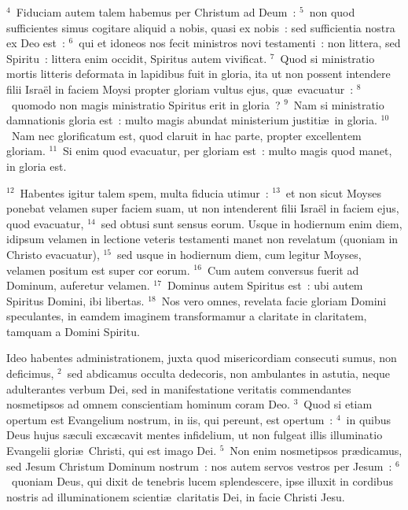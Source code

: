 ${}^{4}$~Fiduciam autem talem habemus per Christum ad Deum~:
${}^{5}$~non quod sufficientes simus cogitare aliquid a nobis, quasi ex nobis~: sed sufficientia nostra ex Deo est~:
${}^{6}$~qui et idoneos nos fecit ministros novi testamenti~: non littera, sed Spiritu~: littera enim occidit, Spiritus autem vivificat.
${}^{7}$~Quod si ministratio mortis litteris deformata in lapidibus fuit in gloria, ita ut non possent intendere filii Isra\"el in faciem Moysi propter gloriam vultus ejus, qu\ae\ evacuatur~:
${}^{8}$~quomodo non magis ministratio Spiritus erit in gloria~?
${}^{9}$~Nam si ministratio damnationis gloria est~: multo magis abundat ministerium justiti\ae\ in gloria.
${}^{10}$~Nam nec glorificatum est, quod claruit in hac parte, propter excellentem gloriam.
${}^{11}$~Si enim quod evacuatur, per gloriam est~: multo magis quod manet, in gloria est.


${}^{12}$~Habentes igitur talem spem, multa fiducia utimur~:
${}^{13}$~et non sicut Moyses ponebat velamen super faciem suam, ut non intenderent filii Isra\"el in faciem ejus, quod evacuatur,
${}^{14}$~sed obtusi sunt sensus eorum. Usque in hodiernum enim diem, idipsum velamen in lectione veteris testamenti manet non revelatum (quoniam in Christo evacuatur),
${}^{15}$~sed usque in hodiernum diem, cum legitur Moyses, velamen positum est super cor eorum.
${}^{16}$~Cum autem conversus fuerit ad Dominum, auferetur velamen.
${}^{17}$~Dominus autem Spiritus est~: ubi autem Spiritus Domini, ibi libertas.
${}^{18}$~Nos vero omnes, revelata facie gloriam Domini speculantes, in eamdem imaginem transformamur a claritate in claritatem, tamquam a Domini Spiritu.

\bchapter
\lettrine[lines=3,image=true,loversize=0.05,lraise=-0.03]{I}{}deo habentes administrationem, juxta quod misericordiam consecuti sumus, non deficimus,
${}^{2}$~sed abdicamus occulta dedecoris, non ambulantes in astutia, neque adulterantes verbum Dei, sed in manifestatione veritatis commendantes nosmetipsos ad omnem conscientiam hominum coram Deo.
${}^{3}$~Quod si etiam opertum est Evangelium nostrum, in iis, qui pereunt, est opertum~:
${}^{4}$~in quibus Deus hujus s\ae culi exc\ae cavit mentes infidelium, ut non fulgeat illis illuminatio Evangelii glori\ae\ Christi, qui est imago Dei.
${}^{5}$~Non enim nosmetipsos pr\ae dicamus, sed Jesum Christum Dominum nostrum~: nos autem servos vestros per Jesum~:
${}^{6}$~quoniam Deus, qui dixit de tenebris lucem splendescere, ipse illuxit in cordibus nostris ad illuminationem scienti\ae\ claritatis Dei, in facie Christi Jesu.


